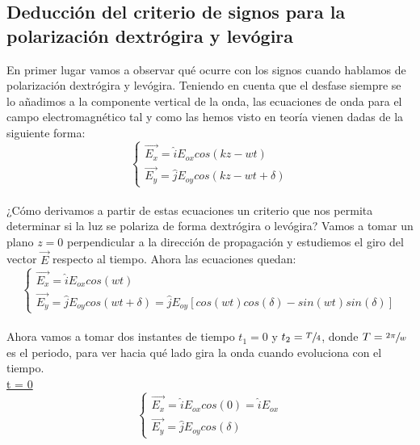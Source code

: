 \documentclass[11pt]{article}
\begin{document}
    \subsection{Deducción del criterio de signos para la polarización dextrógira y levógira}
    \noindent En primer lugar vamos a observar qué ocurre con los signos cuando hablamos de polarización dextrógira y levógira. Teniendo en cuenta que el desfase siempre se lo añadimos a la componente vertical de la onda, las ecuaciones de onda para el campo electromagnético tal y como las hemos visto en teoría vienen dadas de la siguiente forma:
    \begin{equation}
    \left\{ \begin{array}{lr} \Vec{E_x} = \hat{i}E_{ox} cos(kz-wt) \\
    \Vec{E_y} = \hat{j}E_{oy} cos(kz-wt+\delta)  \end{array} \right.
    \end{equation}\label{eq:onda em teoria}\\

    \noindent ¿Cómo derivamos a partir de estas ecuaciones un criterio que nos permita determinar si la luz se polariza de forma dextrógira o levógira? Vamos a tomar un plano $z = 0$ perpendicular a la dirección de propagación y estudiemos el giro del vector $\Vec{E}$ respecto al tiempo. Ahora las ecuaciones quedan:
    \begin{equation*}
    \left\{ \begin{array}{lr} \Vec{E_x} = \hat{i}E_{ox} cos(wt) \\
    \Vec{E_y} = \hat{j}E_{oy} cos(wt+\delta) = \hat{j}E_{oy}[cos(wt)cos(\delta)-sin(wt)sin(\delta)]\end{array} \right.
    \end{equation*}\\

    \noindent Ahora vamos a tomar dos instantes de tiempo $t_1 = 0$ y $t_2 = \sfrac{T}{4}$, donde $T = \sfrac{2\pi}{w}$ es el periodo, para ver hacia qué lado gira la onda cuando evoluciona con el tiempo.\\

    \underline{t = 0}
    \begin{equation*}
    \left\{ \begin{array}{lr} \Vec{E_x} = \hat{i}E_{ox} cos(0) = \hat{i}E_{ox}\\
    \Vec{E_y} = \hat{j}E_{oy} cos(\delta)\end{array} \right.
    \end{equation*}\\
\end{document}
